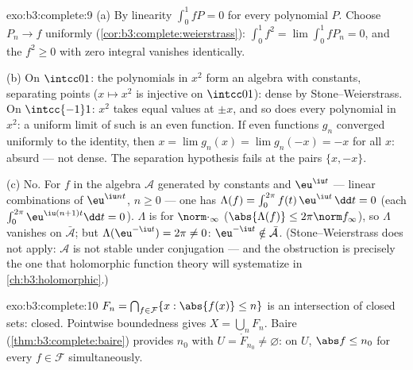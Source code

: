 \begin{solution}{exo:b3:complete:9}
(a) By linearity $\int_0^1 fP = 0$ for every polynomial $P$.
Choose $P_n \to f$ uniformly
(\cref{cor:b3:complete:weierstrass}): $\int_0^1 f^2 =
\lim\int_0^1 fP_n = 0$, and the  $f^2 \geq 0$ with
zero integral vanishes identically.

(b) On $\intcc01$: the polynomials in $x^2$ form an algebra
with constants, separating points ($x \mapsto x^2$ is injective
on $\intcc01$): dense by Stone--Weierstrass. On $\intcc{-1}1$:
$x^2$ takes equal values at $\pm x$, and so does every
polynomial in $x^2$: a uniform limit of such is an even
function. If even functions $g_n$ converged uniformly to the
identity, then $x = \lim g_n(x) = \lim g_n(-x) = -x$ for all
$x$: absurd --- not dense. The separation hypothesis fails at
the pairs $\{x, -x\}$.

(c) No. For $f$ in the algebra $\mathcal A$ generated by
constants and $\eu^{\iu t}$ --- linear combinations of
$\eu^{\iu nt}$, $n \geq 0$ --- one has $\Lambda(f) =
\int_0^{2\pi}f(t)\,\eu^{\iu t}\,\dd t = 0$ (each
$\int_0^{2\pi}\eu^{\iu(n+1)t}\dd t = 0$). $\Lambda$ is
 for $\norm\cdot_\infty$ ($\abs{\Lambda(f)}\leq
2\pi\norm f_\infty$), so $\Lambda$ vanishes on $\bar{\mathcal
A}$; but $\Lambda(\eu^{-\iu t}) = 2\pi \neq 0$: $\eu^{-\iu t}
\notin \bar{\mathcal A}$. (Stone--Weierstrass does not apply:
$\mathcal A$ is not stable under conjugation --- and the
obstruction is precisely the one that holomorphic function
theory will systematize in \cref{ch:b3:holomorphic}.)
\end{solution}

\begin{solution}{exo:b3:complete:10}
$F_n = \bigcap_{f \in \mathcal F}\{x : \abs{f(x)} \leq n\}$ is
an intersection of closed sets: closed. Pointwise boundedness
gives $X = \bigcup_n F_n$. Baire (\cref{thm:b3:complete:baire})
provides $n_0$ with $U = \mathring F_{n_0} \neq \varnothing$:
on $U$, $\abs f \leq n_0$ for every $f \in \mathcal F$
simultaneously.
\end{solution}

